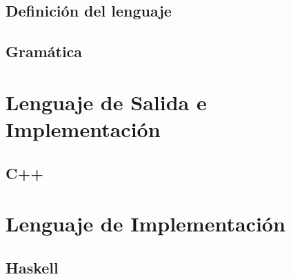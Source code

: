 	\subsection{Definición del lenguaje}
	
	\subsection{Gramática}

\section{Lenguaje de Salida e Implementación}
	\subsection{C++}
	


\section{Lenguaje de Implementación}
	\subsection{Haskell}



